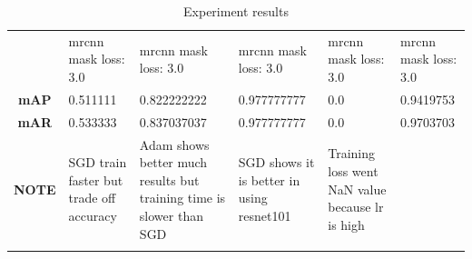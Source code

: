 \begin{longtable}[c]{|c|l|l|l|l|l|}
		& \multirow{2}{*}{mrcnn mask loss: 3.0} & \multirow{2}{*}{mrcnn mask loss: 3.0} & \multirow{2}{*}{mrcnn mask loss: 3.0} & \multirow{2}{*}{mrcnn mask loss: 3.0} & \multirow{2}{*}{mrcnn mask loss: 3.0} \\
		&  &  &  &  &  \\ \hline
		\textbf{mAP} & 0.511111 & 0.822222222 & 0.977777777 & 0.0 & 0.9419753 \\ \hline
		\textbf{mAR} & 0.533333 & 0.837037037 & 0.977777777 & 0.0 & 0.9703703 \\ \hline
		\textbf{NOTE} & SGD train faster but trade off accuracy & Adam shows better much results but training time is slower than SGD & SGD shows it is better in using resnet101 & Training loss went NaN value because lr is high &  \\ \hline
	
	\caption{Experiment results}
	\label{table:exp1}
	\end{longtable}

